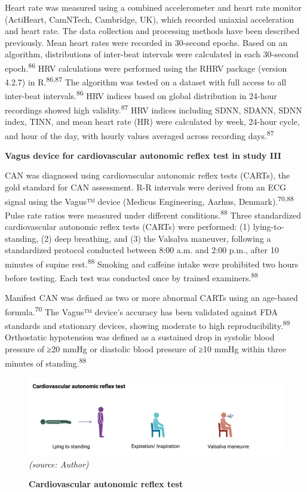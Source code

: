 \documentclass[
  a4paper,
  headsepline=true,
  open=left]{scrbook}
\begin{document}
Heart rate was measured using a combined accelerometer and heart rate
monitor (ActiHeart, CamNTech, Cambridge, UK), which recorded uniaxial
acceleration and heart rate. The data collection and processing methods
have been described previously. Mean heart rates were recorded in
30-second epochs. Based on an algorithm, distributions of inter-beat
intervals were calculated in each 30-second epoch.\textsuperscript{86}
HRV calculations were performed using the RHRV package (version 4.2.7)
in R.\textsuperscript{86,87} The algorithm was tested on a dataset with
full access to all inter-beat intervals.\textsuperscript{86} HRV indices
based on global distribution in 24-hour recordings showed high
validity.\textsuperscript{87} HRV indices including SDNN, SDANN, SDNN
index, TINN, and mean heart rate (HR) were calculated by week, 24-hour
cycle, and hour of the day, with hourly values averaged across recording
days.\textsuperscript{87}

\textbf{Vagus device for cardiovascular autonomic reflex test in study
III}

CAN was diagnosed using cardiovascular autonomic reflex tests (CARTs),
the gold standard for CAN assessment. R-R intervals were derived from an
ECG signal using the Vagus™ device (Medicus Engineering, Aarhus,
Denmark).\textsuperscript{70,88} Pulse rate ratios were measured under
different conditions.\textsuperscript{88} Three standardized
cardiovascular autonomic reflex tests (CARTs) were performed: (1)
lying-to-standing, (2) deep breathing, and (3) the Valsalva maneuver,
following a standardized protocol conducted between 8:00 a.m. and 2:00
p.m., after 10 minutes of supine rest.\textsuperscript{88} Smoking and
caffeine intake were prohibited two hours before testing. Each test was
conducted once by trained examiners.\textsuperscript{88}

Manifest CAN was defined as two or more abnormal CARTs using an
age-based formula.\textsuperscript{70} The Vagus™ device's accuracy has
been validated against FDA standards and stationary devices, showing
moderate to high reproducibility.\textsuperscript{89} Orthostatic
hypotension was defined as a sustained drop in systolic blood pressure
of ≥20 mmHg or diastolic blood pressure of ≥10 mmHg within three minutes
of standing.\textsuperscript{88}

\begin{figure}

{\centering 

\includegraphics{images/cart.png} \emph{(source: Author)}

}

\caption{\label{fig-cart}\textbf{Cardiovascular autonomic reflex test}}

\end{figure}
\end{document}
